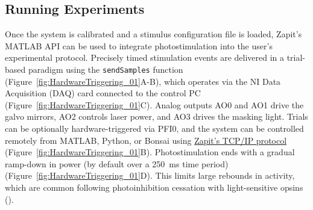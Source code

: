 \subsection{Running Experiments}
Once the system is calibrated and a stimulus configuration file is loaded, Zapit's MATLAB API can be used to integrate photostimulation into the user's experimental protocol.
Precisely timed stimulation events are delivered in a trial-based paradigm using the \texttt{sendSamples} function (Figure~\ref{fig:HardwareTriggering_01}A-B), which operates via the NI Data Acquisition (DAQ) card connected to the control PC (Figure~\ref{fig:HardwareTriggering_01}C).
Analog outputs AO0 and AO1 drive the galvo mirrors, AO2 controls laser power, and AO3 drives the masking light.
Trials can be optionally hardware-triggered via PFI0, and the system can be controlled remotely from MATLAB, Python, or Bonsai using \href{https://github.com/Zapit-Optostim/zapit-tcp-bridge}{Zapit's TCP/IP protocol} (Figure~\ref{fig:HardwareTriggering_01}B).
Photostimulation ends with a gradual ramp-down in power (by default over a 250~ms time period) (Figure~\ref{fig:HardwareTriggering_01}D).
This limits large rebounds in activity, which are common following photoinhibition cessation with light-sensitive opsins (\cite{Li2019SpatiotemporalCircuits}).

